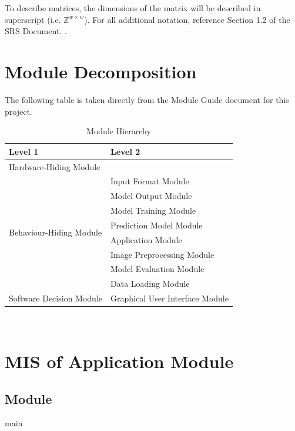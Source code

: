 \documentclass[12pt, titlepage]{article}
\begin{document}
To describe matrices, the dimensions of the matrix will be described in
superscript (i.e. ${\mathbb{Z}^{w \times w}}$). For all additional notation,
reference Section 1.2 of the SRS Document.
\citep{SRS}.

\section{Module Decomposition}

The following table is taken directly from the Module Guide document for this project.

\begin{table}[h!]
\centering
\begin{tabular}{p{} p{}}
\toprule
\textbf{Level 1} & \textbf{Level 2}\\
\midrule

{Hardware-Hiding Module} & ~ \\
\midrule

\multirow{8}{0.3\textwidth}{Behaviour-Hiding Module} &
Input Format Module\\
& Model Output Module\\
& Model Training Module\\
& Prediction Model Module\\
& Application Module\\
& Image Preprocessing Module\\
& Model Evaluation Module\\
& Data Loading Module\\
\midrule

\multirow{1}{0.3\textwidth}{Software Decision Module}&
Graphical User Interface Module\\
\bottomrule

\end{tabular}
\caption{Module Hierarchy}
\label{TblMH}
\end{table}

\newpage
~\newpage

\section{MIS of Application Module} \label{MApplication}

\subsection{Module}

main
\end{document}
